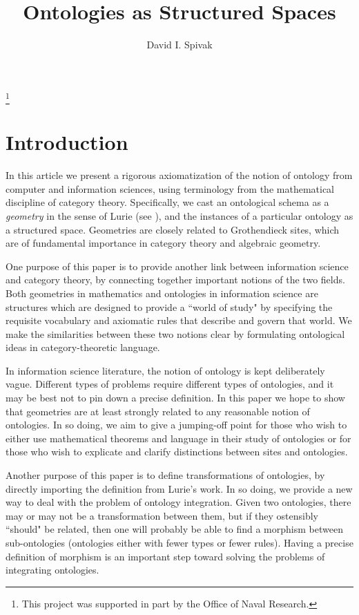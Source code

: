 \documentclass{amsart}
\begin{document}
\title{Ontologies as Structured Spaces}

\thanks{This project was supported in part by the Office of Naval Research.}

\author{David I. Spivak}

\maketitle

\tableofcontents

\section{Introduction}

In this article we present a rigorous axiomatization of the notion of ontology from computer and information sciences, using terminology from the mathematical discipline of category theory.  Specifically, we cast an ontological schema as a {\em geometry} in the sense of Lurie (see \cite{Lur-DAG5}), and the instances of a particular ontology as a structured space.  Geometries are closely related to Grothendieck sites, which are of fundamental importance in category theory and algebraic geometry.

One purpose of this paper is to provide another link between information science and category theory, by connecting together important notions of the two fields.  Both geometries in mathematics and ontologies in information science are structures which are designed to provide a ``world of study" by specifying the requisite vocabulary and axiomatic rules that describe and govern that world.  We make the similarities between these two notions clear by formulating ontological ideas in category-theoretic language.

In information science literature, the notion of ontology is kept deliberately vague.  Different types of problems require different types of ontologies, and it may be best not to pin down a precise definition.  In this paper we hope to show that geometries are at least strongly related to any reasonable notion of ontologies.  In so doing, we aim to give a jumping-off point for those who wish to either use mathematical theorems and language in their study of ontologies or for those who wish to explicate and clarify distinctions between sites and ontologies.  

Another purpose of this paper is to define transformations of ontologies, by directly importing the definition from Lurie's work.  In so doing, we provide a new way to deal with the problem of ontology integration.  Given two ontologies, there may or may not be a transformation between them, but if they ostensibly ``should" be related, then one will probably be able to find a morphism between sub-ontologies (ontologies either with fewer types or fewer rules).  Having a precise definition of morphism is an important step toward solving the problems of integrating ontologies.
\end{document}
